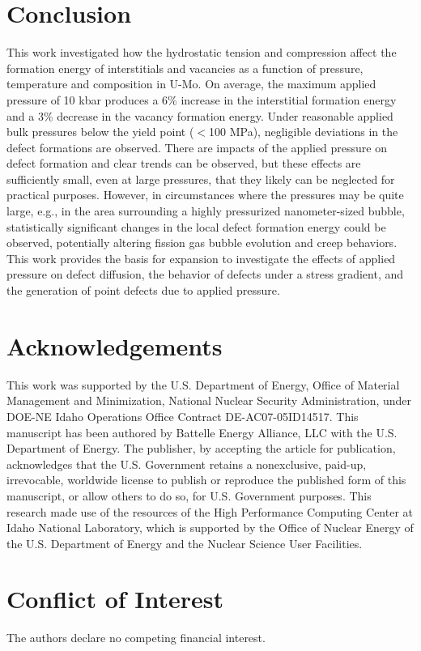 \documentclass[review]{elsarticle}
\begin{document}
\section{Conclusion}\label{sec4}
This work investigated how the hydrostatic tension and compression affect the formation energy of interstitials and vacancies as a function of pressure, temperature and composition in U-Mo. On average, the maximum applied pressure of 10 kbar produces a 6\% increase in the interstitial formation energy and a 3\% decrease in the vacancy formation energy. Under reasonable applied bulk pressures below the yield point ($<$100 MPa), negligible deviations in the defect formations are observed. There are impacts of the applied pressure on defect formation and clear trends can be observed, but these effects are sufficiently small, even at large pressures, that they likely can be neglected for practical purposes. However, in circumstances where the pressures may be quite large, e.g., in the area surrounding a highly pressurized nanometer-sized bubble, statistically significant changes in the local defect formation energy could be observed, potentially altering fission gas bubble evolution and creep behaviors. This work provides the basis for expansion to investigate the effects of applied pressure on defect diffusion, the behavior of defects under a stress gradient, and the generation of point defects due to applied pressure. 

\section{Acknowledgements}\label{sec5}
This work was supported by the U.S. Department of Energy, Office of Material Management and Minimization, National Nuclear Security Administration, under DOE-NE Idaho Operations Office Contract DE-AC07-05ID14517. This manuscript has been authored by Battelle Energy Alliance, LLC with the U.S. Department of Energy. The publisher, by accepting the article for publication, acknowledges that the U.S. Government retains a nonexclusive, paid-up, irrevocable, worldwide license to publish or reproduce the published form of this manuscript, or allow others to do so, for U.S. Government purposes. This research made use of the resources of the High Performance Computing Center at Idaho National Laboratory, which is supported by the Office of Nuclear Energy of the U.S. Department of Energy and the Nuclear Science User Facilities.

\section{Conflict of Interest}\label{sec6}
The authors declare no competing financial interest.
\end{document}
